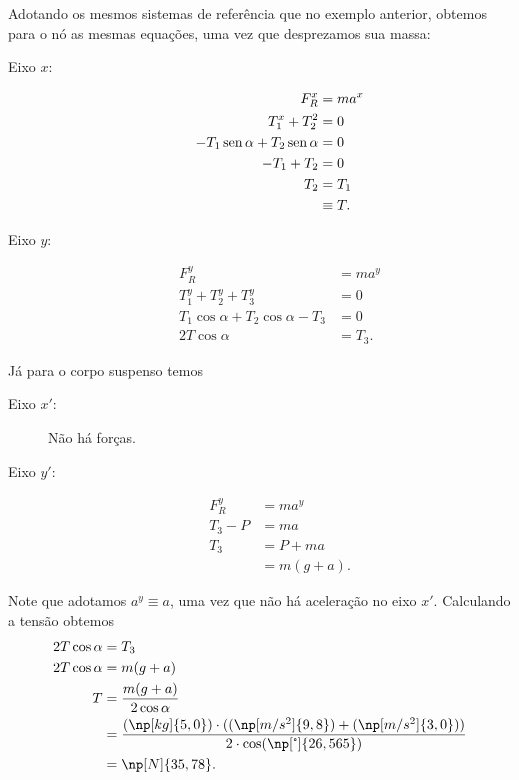 Adotando os mesmos sistemas de referência que no exemplo anterior, obtemos para o nó as mesmas equações, uma vez que desprezamos sua massa:
\begin{description}
    \item[Eixo $x$:]
        \begin{align}
            F_R^x &= m a^x \\
            T_1^x + T_2^2 &= 0 \\
            -T_1 \operatorname{sen}\alpha + T_2 \operatorname{sen}\alpha &= 0 \\
            -T_1 + T_2 &= 0 \\
            T_2 &= T_1 \\
            &\equiv T.
        \end{align}
    \item[Eixo $y$:]
        \begin{align}
            F_R^y &= m a^y \\
            T_1^y + T_2^y + T_3^y &= 0 \\
            T_1\cos\alpha + T_2 \cos\alpha - T_3 &= 0 \\
            2 T\cos\alpha &= T_3.
        \end{align}
\end{description}
%
Já para o corpo suspenso temos
\begin{description}
    \item[Eixo $x'$:] Não há forças.
    \item[Eixo $y'$:]
        \begin{align}
            F_R^y &= m a^y \\
            T_3 - P &= m a \\
            T_3 &= P + ma\\
            &= m(g + a).
        \end{align}
\end{description}
%
Note que adotamos $a^y \equiv a$, uma vez que não há aceleração no eixo $x'$. Calculando a tensão obtemos
\begin{align}
    2 T\cos\alpha &= T_3 \\
    2 T\cos\alpha &= m(g + a) \\
    T &= \frac{m(g+a)}{2\cos\alpha} \\
    &= \frac{(\np[kg]{5,0})\cdot((\np[m/s^2]{9,8})+(\np[m/s^2]{3,0}))}{2\cdot\cos(\np[\tcdegree]{26,565})} \\
    &= \np[N]{35,78}.
\end{align}


